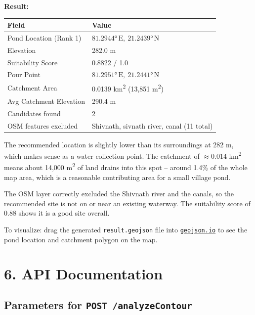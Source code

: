 \documentclass[12pt,a4paper]{article}
\begin{document}
\textbf{Result:}

\begin{center}
\begin{tabular}{ll}
\toprule
Field & Value \\
\midrule
Pond Location (Rank 1) & $81.2944°\,\text{E},\ 21.2439°\,\text{N}$ \\
Elevation              & 282.0 m \\
Suitability Score      & 0.8822 / 1.0 \\
Pour Point             & $81.2951°\,\text{E},\ 21.2441°\,\text{N}$ \\
Catchment Area         & 0.0139 km\textsuperscript{2} (13,851 m\textsuperscript{2}) \\
Avg Catchment Elevation& 290.4 m \\
Candidates found       & 2 \\
OSM features excluded  & Shivnath, sivnath river, canal (11 total) \\
\bottomrule
\end{tabular}
\end{center}

The recommended location is slightly lower than its surroundings at 282 m,
which makes sense as a water collection point. The catchment of
$\approx$0.014 km\textsuperscript{2} means about 14,000 m\textsuperscript{2}
of land drains into this spot -- around 1.4\% of the whole map area, which is
a reasonable contributing area for a small village pond.

The OSM layer correctly excluded the Shivnath river and the canals, so the
recommended site is not on or near an existing waterway. The suitability
score of 0.88 shows it is a good site overall.

To visualize: drag the generated \texttt{result.geojson} file into
\href{https://geojson.io}{\texttt{geojson.io}} to see the pond location and
catchment polygon on the map.

\section*{6. API Documentation}

\subsection*{Parameters for \texttt{POST /analyzeContour}}
\end{document}
